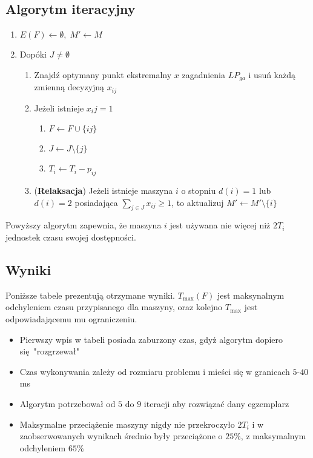 \documentclass[a4paper,11pt]{article}
\theoremstyle{mytheor}
\begin{document}
\subsection*{Algorytm iteracyjny}
\begin{enumerate}
    \item $E(F) \longleftarrow \emptyset,\; M' \longleftarrow M $
    \item Dopóki $J \neq \emptyset$
          \begin{enumerate}
              \item Znajdź optymany punkt ekstremalny $x$ zagadnienia $LP_{ga}$ i usuń każdą zmienną decyzyjną $x_{ij}$
              \item Jeżeli istnieje $x_ij = 1$
                    \begin{enumerate}
                        \item $F \longleftarrow F \cup \{ij\}$
                        \item $J \longleftarrow J \setminus \{j\}$
                        \item $T_i \longleftarrow T_i - p_{ij}$
                    \end{enumerate}
              \item (\textbf{Relaksacja}) Jeżeli istnieje maszyna $i$ o stopniu $d(i) = 1$ lub $d(i) = 2$ posiadająca $\sum_{j\in J} x_{ij} \geq 1$, to aktualizuj $M' \longleftarrow M' \setminus \{i\}$
          \end{enumerate}
\end{enumerate}
Powyższy algorytm zapewnia, że maszyna $i$ jest używana nie więcej niż $2T_i$ jednostek czasu swojej dostępności.

\subsection*{Wyniki}
Poniższe tabele prezentują otrzymane wyniki. $T_{\max}(F)$ jest maksynalnym odchyleniem czasu przypisanego dla maszyny, oraz kolejno $T_{\max}$ jest odpowiadającemu mu ograniczeniu.

\begin{itemize}
    \item Pierwszy wpis w tabeli posiada zaburzony czas, gdyż algorytm dopiero się "rozgrzewał"
    \item Czas wykonywania zależy od rozmiaru problemu i mieści się w granicach $5$-$40$ms
    \item Algorytm potrzebował od $5$ do $9$ iteracji aby rozwiązać dany egzemplarz
    \item Maksymalne przeciążenie maszyny nigdy nie przekroczyło $2T_i$ i w zaobserwowanych wynikach średnio były przeciążone o $25\%$, z maksymalnym odchyleniem $65\%$
\end{itemize}


\end{document}
